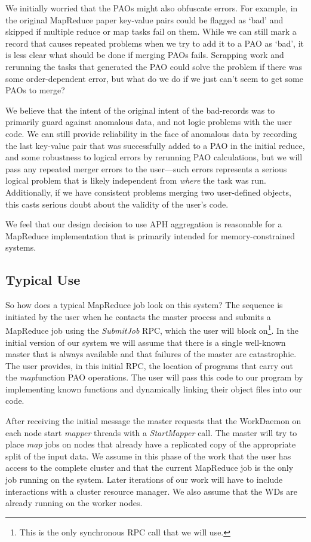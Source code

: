 \documentclass[10pt,letter,final,article,twocolumn]{article} %
\newcommand{\rpc}[1]{\emph{#1}}
\begin{document}
We initially worried that the PAOs might also obfuscate errors. For example, in the original MapReduce paper key-value pairs could be flagged as `bad' and skipped if multiple reduce or map tasks fail on them. While we can still mark a record that causes repeated problems when we try to add it to a PAO as `bad', it is less clear what should be done if merging PAOs fails. Scrapping work and rerunning the tasks that generated the PAO could solve the problem if there was some order-dependent error, but what do we do if we just can't seem to get some PAOs to merge?

We believe that the intent of the original intent of the bad-records was to primarily guard against anomalous data, and not logic problems with the user code. We can still provide reliability in the face of anomalous data by recording the last key-value pair that was successfully added to a PAO in the initial reduce, and some robustness to logical errors by rerunning PAO calculations, but we will  pass any repeated merger errors to the user---such errors represents a serious logical problem that is likely independent from \emph{where} the task was run. Additionally, if we have consistent problems merging two user-defined objects, this casts serious doubt about the validity of the user's code.

We feel that our design decision to use APH aggregation is reasonable for a MapReduce implementation that is primarily intended for memory-constrained systems.

\subsection{Typical Use}

So how does a typical MapReduce job look on this system? The sequence is initiated by the user when he contacts the master process and submits a MapReduce job using the \rpc{SubmitJob} RPC, which the user will block on\footnote{This is the only synchronous RPC call that we will use.}. In the initial version of our system we will assume that there is a single well-known master that is always available and that failures of the master are catastrophic. The user provides, in this initial RPC, the location of programs that carry out the \emph{map}function PAO operations. The user will pass this code to our program by implementing known functions and dynamically linking their object files into our code.

After receiving the initial message the master requests that the WorkDaemon on each node start \emph{mapper} threads with a \rpc{StartMapper} call. The master will try to place \emph{map} jobs on nodes that already have a replicated copy of the appropriate split of the input data.  We assume in this phase of the work that the user has access to the complete cluster and that the current MapReduce job is the only job running on the system. Later iterations of our work will have to include interactions with a cluster resource manager. We also assume that the WDs are already running on the worker nodes.
\end{document}
